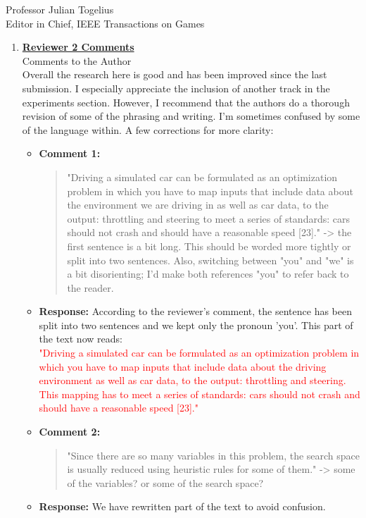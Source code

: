 \documentclass[10pt]{letter} %
\begin{document}
\begin{letter}{Professor Julian Togelius \\ Editor in Chief, IEEE Transactions on Games}
\begin{enumerate}
\newpage


\item {\bf \underline{ Reviewer 2 Comments}}\\
	Comments to the Author\\
	Overall the research here is good and has been improved since the last submission. I especially appreciate the inclusion of another track in the experiments section.
	However, I recommend that the authors do a thorough revision of some of the phrasing and writing. I'm sometimes confused by some of the language within.
	A few corrections for more clarity:	
	\begin{itemize}			
		\item {\bf Comment 1:}
			\begin{quote}
				"Driving a simulated car can be formulated as an optimization problem in which you have to map inputs that include data about the environment we are driving in as well as car data, to the output: throttling and steering to meet a series of standards: cars should not crash and should have a reasonable speed [23]." -> the first sentence is a bit long. This should be worded more tightly or split into two sentences. Also, switching between "you" and "we" is a bit disorienting; I'd make both references "you" to refer back to the reader.
			\end{quote}	
		\item {\bf Response:} 
				According to the reviewer's comment, the sentence has been split into two sentences and we kept only the pronoun 'you'. This part of the text now reads: \\
			\textcolor{red}{
				"Driving a simulated car can be formulated as an optimization
				problem in which you have to map inputs that
				include data about the driving environment as well as car
				data, to the output: throttling and steering. This mapping
				has to meet a series of standards: cars should not crash
				and should have a reasonable speed [23]."}

		\item {\bf Comment 2:}
			\begin{quote}
				"Since there are so many variables in this problem, the search space is usually reduced using heuristic rules for some of them." -> some of the variables? or some of the search space?
			\end{quote}	
		\item {\bf Response:} 
		We have rewritten part of the text to avoid confusion.


\end{itemize}
\end{enumerate}
\end{letter}
\end{document}
